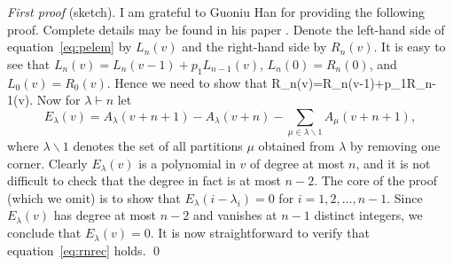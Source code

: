 \documentclass[12pt]{article}
\theoremstyle{definition}
\theoremstyle{remark}
\begin{document}
\emph{First proof} (sketch). I am grateful to Guoniu Han for providing
the following proof. Complete details may be found in his paper
\cite{han3}.  Denote the left-hand side of equation~\eqref{eq:pelem}
by $L_n(v)$ and the right-hand side by $R_n(v)$. It is easy to see that 
$L_n(v)=L_n(v-1)+p_1L_{n-1}(v)$, $L_n(0)=R_n(0)$, and
$L_0(v)=R_0(v)$. Hence we need to show that 
  \beq R_n(v)=R_n(v-1)+p_1R_{n-1}(v). \label{eq:rnrec} \eeq
Now for $\lambda\vdash n$ let
  $$ E_\lambda(v) =  A_\lambda(v+n+1)-A_\lambda(v+n)
  -\sum_{\mu\in\lambda\backslash 1}A_\mu(v+n+1), $$
where $\lambda\backslash 1$ denotes the set of all partitions $\mu$
obtained from $\lambda$ by removing one corner. Clearly $E_\lambda(v)$
is a polynomial in $v$ of degree at most $n$, and it is not difficult
to check that the degree in fact is at most $n-2$. The core of the
proof (which we omit) is to show that $E_\lambda(i-\lambda_i)=0$ for
$i=1,2,\dots,n-1$. Since $E_\lambda(v)$ has degree at most $n-2$ and
vanishes at $n-1$ distinct integers, we conclude that
$E_\lambda(v)=0$. It is now straightforward to verify that
equation~\eqref{eq:rnrec} holds.
\qed
\end{document}
